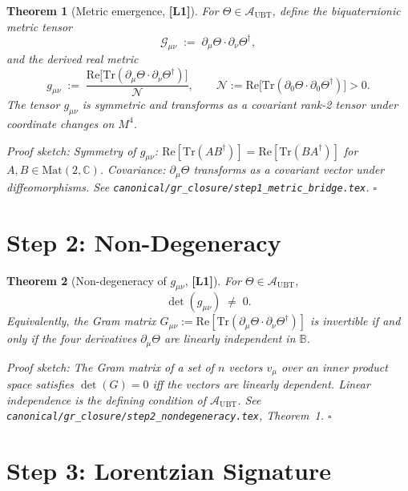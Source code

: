 \documentclass[12pt,a4paper]{article}
\newtheorem{theorem}{Theorem}[section]
\theoremstyle{definition}
\theoremstyle{remark}
\newcommand{\Lone}{\textbf{[L1]}}
\begin{document}
\begin{theorem}[Metric emergence, \Lone]
\label{thm:metric_emergence}
For $\Theta \in \mathcal{A}_{\mathrm{UBT}}$, define the biquaternionic metric
tensor
\[
  \mathcal{G}_{\mu\nu} \;:=\; \partial_\mu\Theta \cdot \partial_\nu\Theta^\dagger,
\]
and the derived real metric
\[
  g_{\mu\nu} \;:=\; \frac{\mathrm{Re}\bigl[\mathrm{Tr}(\partial_\mu\Theta
  \cdot\partial_\nu\Theta^\dagger)\bigr]}{\mathcal{N}},
  \qquad \mathcal{N} := \mathrm{Re}\bigl[\mathrm{Tr}
  (\partial_0\Theta\cdot\partial_0\Theta^\dagger)\bigr] > 0.
\]
The tensor $g_{\mu\nu}$ is symmetric and transforms as a covariant rank-2 tensor
under coordinate changes on $M^4$.

\medskip
\emph{Proof sketch}: Symmetry of $g_{\mu\nu}$: $\mathrm{Re}[\mathrm{Tr}(AB^\dagger)]
= \mathrm{Re}[\mathrm{Tr}(BA^\dagger)]$ for $A,B\in\mathrm{Mat}(2,\mathbb{C})$.
Covariance: $\partial_\mu\Theta$ transforms as a covariant vector under
diffeomorphisms.  See \texttt{canonical/gr\_closure/step1\_metric\_bridge.tex}.
\hfill$\square$
\end{theorem}

\section{Step 2: Non-Degeneracy}
\label{sec:step2}

\begin{theorem}[Non-degeneracy of $g_{\mu\nu}$, \Lone]
\label{thm:nondegeneracy}
For $\Theta \in \mathcal{A}_{\mathrm{UBT}}$,
\[
  \det(g_{\mu\nu}) \;\neq\; 0.
\]
Equivalently, the Gram matrix $G_{\mu\nu} := \mathrm{Re}[\mathrm{Tr}(\partial_\mu\Theta
\cdot\partial_\nu\Theta^\dagger)]$ is invertible if and only if the four derivatives
$\partial_\mu\Theta$ are linearly independent in $\mathbb{B}$.

\medskip
\emph{Proof sketch}: The Gram matrix of a set of $n$ vectors $v_\mu$ over an inner
product space satisfies $\det(G) = 0$ iff the vectors are linearly dependent.
Linear independence is the defining condition of $\mathcal{A}_{\mathrm{UBT}}$.
See \texttt{canonical/gr\_closure/step2\_nondegeneracy.tex}, Theorem~1.
\hfill$\square$
\end{theorem}

\section{Step 3: Lorentzian Signature}
\label{sec:step3}
\end{document}

